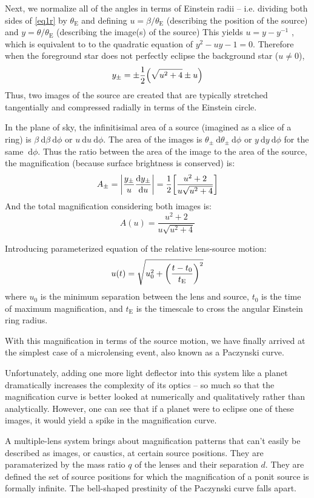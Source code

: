 \documentclass[12pt, a4paper, twocolumn]{article}
\begin{document}
Next, we normalize all of the angles in terms of Einstein radii -- i.e. dividing both sides of \ref{eq1r} by $\theta _\mathrm E$
and defining 
$u=\beta /\theta _\mathrm E$ (describing the position of the source)
and $y=\theta /\theta _\mathrm E$ (describing the image(s) of the source)
This yields
$u=y-y^{-1}$
, which is equivalent to to the quadratic equation of
$y^2-uy-1=0$.
Therefore when the foreground star does not perfectly eclipse the background star ($u\neq 0$),
\[y_\pm = \pm \frac12\pqty{\sqrt{u^2+4}\pm u}\]
Thus, two images of the source are created that are typically stretched tangentially and compressed radially
\cite{gaudi} in terms of the Einstein circle.

In the plane of sky, the infinitisimal area of a source (imagined as a slice of a ring) is $\beta \ \mathrm d \beta \ \mathrm d \phi$ or $u \ \mathrm d u \ \mathrm d \phi$.
The area of the images is $\theta _\pm \ \mathrm d \theta _\pm \ \mathrm d \phi$ or $y \ \mathrm d y \ \mathrm d \phi$
for the same $ \ \mathrm d \phi$.\cite{gl_princ}
Thus the ratio between the area of the image to the area of the source, the magnification (because surface brightness is conserved)
is:
\[A_\pm = \abs{\frac{y_\pm}{u}\dv{y_\pm}{u}}
=\frac12\bqty{\frac{u^2+2}{u\sqrt{u^2+4}}}\]
And the total magnification considering both images is:
\[A(u)=\frac{u^2+2}{u\sqrt{u^2+4}}\]

Introducing parameterized equation of the relative lens-source motion:
\[u(t)=\sqrt{u_0^2+\pqty{\frac{t-t_0}{t_\mathrm E}}^2}\]
where $u_0$ is the minimum separation between the lens and source, $t_0$ is the time of maximum magnification, and $t_\mathrm E$ is the timescale to cross the angular Einstein ring radius.

With this magnification in terms of the source motion, we have finally arrived at the simplest case of a microlensing event, also known as a Paczynski curve.\cite{gaudi}

Unfortunately, adding one more light deflector into this system like a planet dramatically increases the complexity of its optics -- so much so that the magnification curve is better looked at numerically and qualitatively rather than analytically. However, one can see that if a planet were to eclipse one of these images, it would yield a spike in the magnification curve.

A multiple-lens system brings about magnification patterns that can't easily be described as images, or caustics, at certain source positions.
They are paramaterized by the mass ratio $q$ of the lenses and their separation $d$.
They are defined the set of source positions for which the magnification of a ponit source is formally infinite.
The bell-shaped prestinity of the Paczynski curve falls apart.
\end{document}
